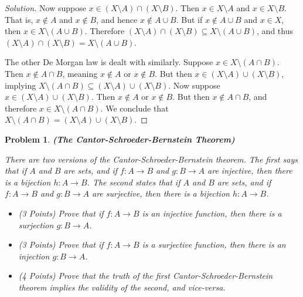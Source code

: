 \documentclass{article}
\theoremstyle{normal}
\newtheorem{problem}{Problem}
\begin{document}
\begin{proof}[Solution]
        Now suppose $x\in(X\setminus{A})\cap(X\setminus{B})$. Then
        $x\in{X}\setminus{A}$ and $x\in{X}\setminus{B}$. That is,
        $x\notin{A}$ and $x\notin{B}$, and hence $x\notin{A}\cup{B}$. But if
        $x\notin{A}\cup{B}$ and $x\in{X}$, then $x\in{X}\setminus(A\cup{B})$.
        Therefore
        $(X\setminus{A})\cap(X\setminus{B})\subseteq{X}\setminus(A\cup{B})$,
        and thus $(X\setminus{A})\cap(X\setminus{B})={X}\setminus(A\cup{B})$.
        \par\hfill\par
        The other De Morgan law is dealt with similarly. Suppose
        $x\in{X}\setminus(A\cap{B})$. Then $x\notin{A}\cap{B}$, meaning
        $x\notin{A}$ or $x\notin{B}$. But then
        $x\in(X\setminus{A})\cup(X\setminus{B})$, implying
        $X\setminus(A\cap{B})\subseteq(X\setminus{A})\cup(X\setminus{B})$.
        Now suppose $x\in(X\setminus{A})\cup(X\setminus{B})$. Then
        $x\notin{A}$ or $x\notin{B}$. But then $x\notin{A}\cap{B}$, and
        therefore $x\in{X}\setminus(A\cap{B})$.
        We conclude that
        $X\setminus(A\cap{B})=(X\setminus{A})\cup(X\setminus{B})$.
    \end{proof}
    \newpage
    \color{blue}
    \begin{problem}
        \textbf{(The Cantor-Schroeder-Bernstein Theorem)}
        \par\hfill\par
        There are two versions of the Cantor-Schroeder-Bernstein theorem. The
        first says that if $A$ and $B$ are sets, and if $f:A\rightarrow{B}$ and
        $g:B\rightarrow{A}$ are injective, then there is a bijection
        $h:A\rightarrow{B}$. The second states that if
        $A$ and $B$ are sets, and if $f:A\rightarrow{B}$ and $g:B\rightarrow{A}$
        are surjective, then there is a bijection $h:A\rightarrow{B}$.
        \begin{itemize}
            \item (3 Points) Prove that if $f:A\rightarrow{B}$ is an injective
                function, then there is a surjection $g:B\rightarrow{A}$.
            \item (3 Points) Prove that if $f:A\rightarrow{B}$ is a surjective
                function, then there is an injection $g:B\rightarrow{A}$.
            \item (4 Points) Prove that the truth of the first
                Cantor-Schroeder-Bernstein theorem implies the validity of the
                second, and vice-versa.
        \end{itemize}
    \end{problem}
\end{document}
